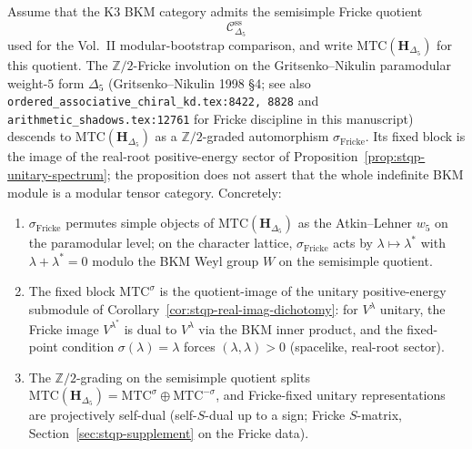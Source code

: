 \begin{proposition}
\label{prop:stqp-fricke-mtc}
Assume that the K3 BKM category admits the semisimple Fricke quotient
\[
\mathcal C^{\mathrm{ss}}_{\Delta_5}
\]
used for the Vol.~II modular-bootstrap comparison, and write
$\mathrm{MTC}(\mathbf H_{\Delta_5})$ for this quotient. The
$\mathbb Z/2$-Fricke involution on the Gritsenko--Nikulin
paramodular weight-$5$ form $\Delta_5$
(Gritsenko--Nikulin 1998 \S 4; see also
\texttt{ordered\_associative\_chiral\_kd.tex:8422, 8828} and
\texttt{arithmetic\_shadows.tex:12761} for Fricke discipline in
this manuscript) descends to
$\mathrm{MTC}(\mathbf H_{\Delta_5})$ as a $\mathbb Z/2$-graded
automorphism $\sigma_{\mathrm{Fricke}}$. Its fixed block is the
image of the real-root positive-energy sector of
Proposition~\ref{prop:stqp-unitary-spectrum}; the proposition does
not assert that the whole indefinite BKM module is a modular tensor
category.
Concretely:
\begin{enumerate}[label=\textup{(\roman*)}]
\item $\sigma_{\mathrm{Fricke}}$ permutes simple objects of
$\mathrm{MTC}(\mathbf H_{\Delta_5})$ as the Atkin--Lehner
$w_5$ on the paramodular level; on the character lattice,
$\sigma_{\mathrm{Fricke}}$ acts by $\lambda \mapsto \lambda^*$
with $\lambda + \lambda^* = 0$ modulo the BKM Weyl group $W$ on
the semisimple quotient.
\item The fixed block $\mathrm{MTC}^{\sigma}$ is the quotient-image
of the unitary positive-energy submodule of
Corollary~\ref{cor:stqp-real-imag-dichotomy}: for
$V^\lambda$ unitary, the Fricke image $V^{\lambda^*}$ is dual
to $V^\lambda$ via the BKM inner product, and the fixed-point
condition $\sigma(\lambda) = \lambda$ forces
$(\lambda, \lambda) > 0$ (spacelike, real-root sector).
\item The $\mathbb Z/2$-grading on the semisimple quotient splits
$\mathrm{MTC}(\mathbf H_{\Delta_5}) = \mathrm{MTC}^{\sigma}
\oplus\mathrm{MTC}^{-\sigma}$, and Fricke-fixed unitary
representations are projectively self-dual (self-$S$-dual up
to a sign; Fricke $S$-matrix, Section~\ref{sec:stqp-supplement}
on the Fricke data).
\end{enumerate}
\end{proposition}

